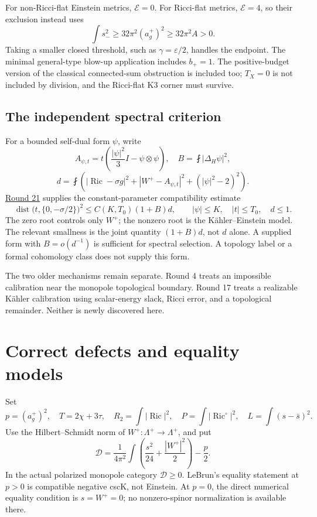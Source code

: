 \documentclass[
  11pt,
]{article}
\begin{document}
For non-Ricci-flat Einstein metrics, \(\mathcal E=0\). For Ricci-flat
metrics, \(\mathcal E=4\), so their exclusion instead uses \[
\int s_-^2\ge32\pi^2(a_g^+)^2\ge32\pi^2A>0.
\] Taking a smaller closed threshold, such as \(\gamma=\varepsilon/2\),
handles the endpoint. The minimal general-type blow-up application
includes \(b_+=1\). The positive-budget version of the classical
connected-sum obstruction is included too; \(T_X=0\) is not included by
division, and the Ricci-flat K3 corner must survive.

\hypertarget{the-independent-spectral-criterion}{%
\subsection{The independent spectral
criterion}\label{the-independent-spectral-criterion}}

For a bounded self-dual form \(\psi\), write \[
A_{\psi,t}=t\left(\frac{|\psi|^2}{3}I-\psi\otimes\psi\right),\quad
B=\fint|\Delta_H\psi|^2,
\] \[
d=\fint\left(
|\operatorname{Ric}-\sigma g|^2+
|W^+-A_{\psi,t}|^2+(|\psi|^2-2)^2\right).
\] \href{round21_analytic.md}{Round 21} supplies the constant-parameter
compatibility estimate \[
\operatorname{dist}\bigl(t,\{0,-\sigma/2\}\bigr)^2
\le C(K,T_0)(1+B)d,\qquad |\psi|\le K,\quad |t|\le T_0,\quad d\le1.
\tag{2}
\] The zero root controls only \(W^+\); the nonzero root is the
Kähler--Einstein model. The relevant smallness is the joint quantity
\((1+B)d\), not \(d\) alone. A supplied form with \(B=o(d^{-1})\) is
sufficient for spectral selection. A topology label or a formal
cohomology class does not supply this form.

The two older mechanisms remain separate. Round 4 treats an impossible
calibration near the monopole topological boundary. Round 17 treats a
realizable Kähler calibration using scalar-energy slack, Ricci error,
and a topological remainder. Neither is newly discovered here.

\hypertarget{correct-defects-and-equality-models}{%
\section{Correct defects and equality
models}\label{correct-defects-and-equality-models}}

Set \[
p=(a_g^+)^2,\quad T=2\chi+3\tau,\quad
R_2=\int|\operatorname{Ric}|^2,\quad
P=\int|\operatorname{Ric}^{\circ}|^2,\quad
L=\int(s-\bar s)^2.
\] Use the Hilbert--Schmidt norm of \(W^+:\Lambda^+\to\Lambda^+\), and
put \[
\mathscr D=
\frac1{4\pi^2}\int\left(\frac{s^2}{24}+\frac{|W^+|^2}{2}\right)-\frac p2.
\tag{3}
\] In the actual polarized monopole category \(\mathscr D\ge0\).
LeBrun's equality statement at \(p>0\) is compatible negative cscK, not
Einstein. At \(p=0\), the direct numerical equality condition is
\(s=W^+=0\); no nonzero-spinor normalization is available there.
\end{document}

